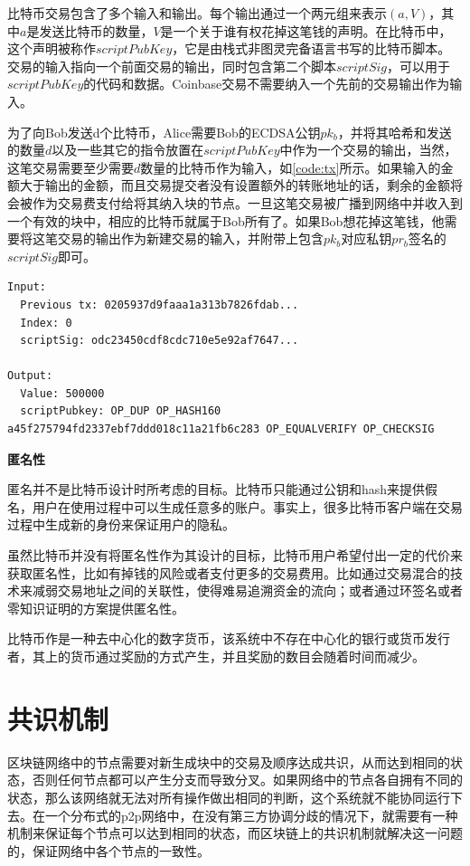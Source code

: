 比特币交易包含了多个输入和输出。每个输出通过一个两元组来表示$(a,V)$，其中$a$是发送比特币的数量，$V$是一个关于谁有权花掉这笔钱的声明。在比特币中，这个声明被称作$scriptPubKey$，它是由栈式非图灵完备语言书写的比特币脚本。交易的输入指向一个前面交易的输出，同时包含第二个脚本$scriptSig$，可以用于$scriptPubKey$的代码和数据。Coinbase交易不需要纳入一个先前的交易输出作为输入。

为了向Bob发送d个比特币，Alice需要Bob的ECDSA公钥$pk_b$，并将其哈希和发送的数量$d$以及一些其它的指令放置在$scriptPubKey$中作为一个交易的输出，当然，这笔交易需要至少需要$d$数量的比特币作为输入，如\ref{code:tx}所示。如果输入的金额大于输出的金额，而且交易提交者没有设置额外的转账地址的话，剩余的金额将会被作为交易费支付给将其纳入块的节点。一旦这笔交易被广播到网络中并收入到一个有效的块中，相应的比特币就属于Bob所有了。如果Bob想花掉这笔钱，他需要将这笔交易的输出作为新建交易的输入，并附带上包含$pk_b$对应私钥$pr_b$签名的$scriptSig$即可。

\begin{lstlisting}[caption={比特币交易实例}, label=code:tx]
Input:
  Previous tx: 0205937d9faaa1a313b7826fdab...
  Index: 0
  scriptSig: odc23450cdf8cdc710e5e92af7647...

Output:
  Value: 500000
  scriptPubkey: OP_DUP OP_HASH160 a45f275794fd2337ebf7ddd018c11a21fb6c283 OP_EQUALVERIFY OP_CHECKSIG

\end{lstlisting}


\noindent\textbf{匿名性}

匿名并不是比特币设计时所考虑的目标。比特币只能通过公钥和hash来提供假名，用户在使用过程中可以生成任意多的账户。事实上，很多比特币客户端在交易过程中生成新的身份来保证用户的隐私。

虽然比特币并没有将匿名性作为其设计的目标，比特币用户希望付出一定的代价来获取匿名性，比如有掉钱的风险或者支付更多的交易费用。比如通过交易混合\supercite{bonneau2014mixcoin}的技术来减弱交易地址之间的关联性，使得难易追溯资金的流向；或者通过环签名或者零知识证明\supercite{kosba2016hawk}的方案提供匿名性。


比特币作是一种去中心化的数字货币，该系统中不存在中心化的银行或货币发行者，其上的货币通过奖励的方式产生，并且奖励的数目会随着时间而减少。

\section{共识机制}

区块链网络中的节点需要对新生成块中的交易及顺序达成共识，从而达到相同的状态，否则任何节点都可以产生分支而导致分叉。如果网络中的节点各自拥有不同的状态，那么该网络就无法对所有操作做出相同的判断，这个系统就不能协同运行下去。在一个分布式的p2p网络中，在没有第三方协调分歧的情况下，就需要有一种机制来保证每个节点可以达到相同的状态，而区块链上的共识机制就解决这一问题的，保证网络中各个节点的一致性。

